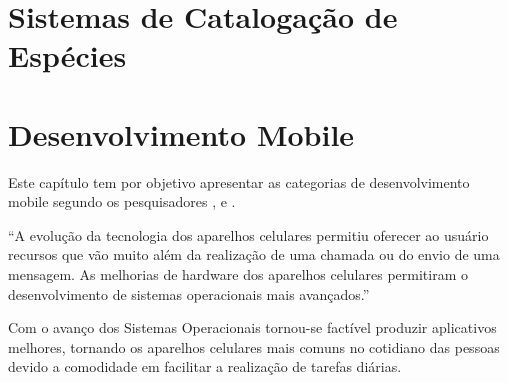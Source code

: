 




\section{Sistemas de Catalogação de Espécies}

 
\section{Desenvolvimento Mobile}

Este capítulo tem por objetivo apresentar as categorias de desenvolvimento mobile segundo os pesquisadores ,  e .

\begin{citacao}
	“A evolução da tecnologia dos aparelhos celulares permitiu oferecer ao usuário recursos que vão muito além da realização de uma chamada ou do envio de uma mensagem. As melhorias de hardware dos aparelhos celulares permitiram o desenvolvimento de sistemas operacionais mais avançados.”\cite[]{da2014paradigmas}
\end{citacao}

Com o avanço dos Sistemas Operacionais tornou-se factível produzir aplicativos melhores, tornando os aparelhos celulares mais comuns no cotidiano das pessoas devido a comodidade em facilitar a realização de tarefas diárias.

